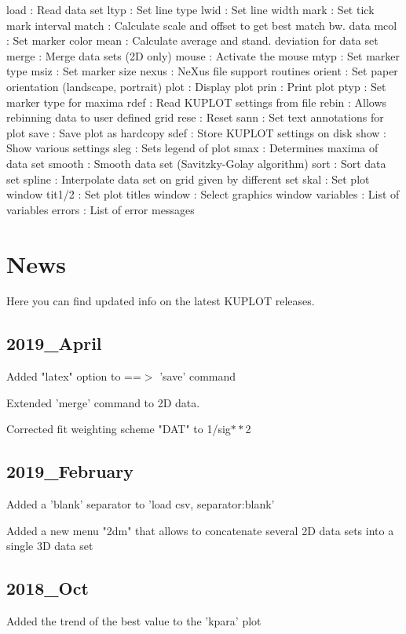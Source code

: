 \begin{MacVerbatim}
load          : Read data set
ltyp          : Set line type
lwid          : Set line width
mark          : Set tick mark interval
match         : Calculate scale and offset to get best match bw. data
mcol          : Set marker color
mean          : Calculate average and stand. deviation for data set
merge         : Merge data sets (2D only)
mouse         : Activate the mouse
mtyp          : Set marker type
msiz          : Set marker size
nexus         : NeXus file support routines
orient        : Set paper orientation (landscape, portrait)
plot          : Display plot
prin          : Print plot
ptyp          : Set marker type for maxima
rdef          : Read KUPLOT settings from file
rebin         : Allows rebinning data to user defined grid
rese          : Reset
sann          : Set text annotations for plot
save          : Save plot as hardcopy
sdef          : Store KUPLOT settings on disk
show          : Show various settings
sleg          : Sets legend of plot
smax          : Determines maxima of data set
smooth        : Smooth data set (Savitzky-Golay algorithm)
sort          : Sort data set
spline        : Interpolate data set on grid given by different set
skal          : Set plot window
tit1/2        : Set plot titles
window        : Select graphics window
variables     : List of variables
errors        : List of error messages
\end{MacVerbatim}
\section{News}
\par
Here you can find updated info on the latest KUPLOT releases. 
\subsection*{2019\_April}
\par
Added "latex" option to ==$> $ 'save' command 
\par
Extended 'merge' command to 2D data. 
\par
Corrected fit weighting scheme "DAT" to 1/sig$**$2 
\subsection*{2019\_February}
\par
Added a 'blank' separator to 'load csv, separator:blank' 
\par
Added a new menu "2dm" that allows to concatenate 
several 2D data sets into a single 3D data set 
\subsection*{2018\_Oct}
\par
Added the trend of the best value to the 'kpara' plot 

